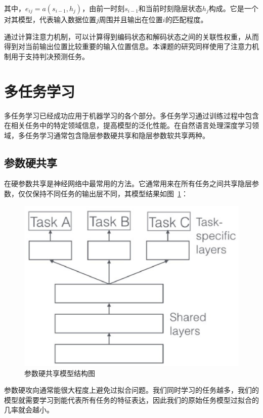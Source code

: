 其中，$e_{ij}=a(s_{i-1},h_j)$，由前一时刻$s_{i-1}$和当前时刻隐层状态$h_j$构成。它是一个对其模型，代表输入数据位置$j$周围并且输出在位置$i$的匹配程度。

通过计算注意力机制，可以计算得到编码状态和解码状态之间的关联性权重，从而得到对当前输出位置比较重要的输入位置信息。本课题的研究同样使用了注意力机制用于支持判决预测任务。

\section{多任务学习}

多任务学习已经成功应用于机器学习的各个部分。多任务学习通过训练过程中包含在相关任务中的特定领域信息，提高模型的泛化性能。在自然语言处理深度学习领域，多任务学习通常包含隐层参数硬共享和隐层参数软共享两种。

\subsection{参数硬共享}
在硬参数共享是神经网络中最常用的方法。它通常用来在所有任务之间共享隐层参数，仅仅保持不同任务的输出层不同，其模型结果如图~\ref{fig:hard_share}：

\begin{figure}[htb]
    \centering
    \includegraphics[scale=0.5, clip=true]{./sources/rel_hard_share.eps}
    \vspace{-10pt}
    \caption{\label{fig:hard_share} 参数硬共享模型结构图}
    \vspace{-5pt}
\end{figure}


参数硬攻向通常能很大程度上避免过拟合问题。我们同时学习的任务越多，我们的模型就需要学习到能代表所有任务的特征表达，因此我们的原始任务模型过拟合的几率就会越小。

